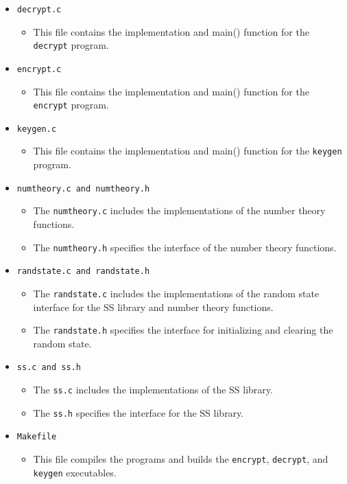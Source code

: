 \documentclass[12pt]{article}
\begin{document}
\begin{itemize}
   \item \texttt{decrypt.c}
   \begin{itemize}
     \item This file contains the implementation and main() function for the \texttt{decrypt} program.
   \end{itemize}
   \item \texttt{encrypt.c}
   \begin{itemize}
     \item This file contains the implementation and main() function for the \texttt{encrypt} program.
   \end{itemize}
   \item \texttt{keygen.c}
   \begin{itemize}
     \item This file contains the implementation and main() function for the \texttt{keygen} program.
   \end{itemize}
   \item \texttt{numtheory.c and numtheory.h}
   \begin{itemize}
     \item The \texttt{numtheory.c} includes the implementations of the number theory functions.
     \item The \texttt{numtheory.h} specifies the interface of the number theory functions.
   \end{itemize}
   \item \texttt{randstate.c and randstate.h}
   \begin{itemize}
     \item The \texttt{randstate.c} includes the implementations of the random state interface for the SS library and number theory functions. 
     \item The \texttt{randstate.h} specifies the interface for initializing and clearing the random state.
   \end{itemize} 
   \item \texttt{ss.c and ss.h}
   \begin{itemize}
     \item The \texttt{ss.c} includes the implementations of the SS library. 
     \item The \texttt{ss.h} specifies the interface for the SS library.
   \end{itemize}
   \item \texttt{Makefile}
   \begin{itemize}
     \item This file compiles the programs and builds the \texttt{encrypt}, \texttt{decrypt}, and \texttt{keygen} executables.

\end{itemize}
\end{itemize}
\end{document}
